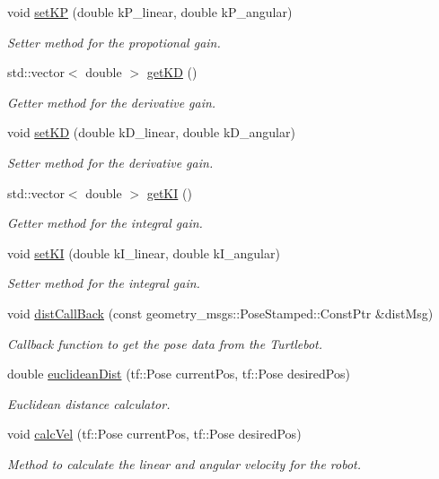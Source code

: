 \begin{DoxyCompactItemize}
void \hyperlink{classPidController_a7919dfdd721488b7062d031c295f94d9}{set\+KP} (double k\+P\+\_\+linear, double k\+P\+\_\+angular)
\begin{DoxyCompactList}\small\item\em Setter method for the propotional gain. \end{DoxyCompactList}\item 
std\+::vector$<$ double $>$ \hyperlink{classPidController_ad43a8028641d06477d7082cf29a05aa3}{get\+KD} ()
\begin{DoxyCompactList}\small\item\em Getter method for the derivative gain. \end{DoxyCompactList}\item 
void \hyperlink{classPidController_af2089d082303543f70b08a2a11e0c928}{set\+KD} (double k\+D\+\_\+linear, double k\+D\+\_\+angular)
\begin{DoxyCompactList}\small\item\em Setter method for the derivative gain. \end{DoxyCompactList}\item 
std\+::vector$<$ double $>$ \hyperlink{classPidController_a0d33ac884b7de8b3218f6c80239d7d7c}{get\+KI} ()
\begin{DoxyCompactList}\small\item\em Getter method for the integral gain. \end{DoxyCompactList}\item 
void \hyperlink{classPidController_ad77c4309d1bac07395a906be6985d801}{set\+KI} (double k\+I\+\_\+linear, double k\+I\+\_\+angular)
\begin{DoxyCompactList}\small\item\em Setter method for the integral gain. \end{DoxyCompactList}\item 
void \hyperlink{classPidController_a3be39f89aeb0c489ac55a93b2cf3afd9}{dist\+Call\+Back} (const geometry\+\_\+msgs\+::\+Pose\+Stamped\+::\+Const\+Ptr \&dist\+Msg)
\begin{DoxyCompactList}\small\item\em Callback function to get the pose data from the Turtlebot. \end{DoxyCompactList}\item 
double \hyperlink{classPidController_a6ebafee7b98417079b7a07433566ead1}{euclidean\+Dist} (tf\+::\+Pose current\+Pos, tf\+::\+Pose desired\+Pos)
\begin{DoxyCompactList}\small\item\em Euclidean distance calculator. \end{DoxyCompactList}\item 
void \hyperlink{classPidController_a08d0ca81d46313df3a5b3f0a8be29d87}{calc\+Vel} (tf\+::\+Pose current\+Pos, tf\+::\+Pose desired\+Pos)
\begin{DoxyCompactList}\small\item\em Method to calculate the linear and angular velocity for the robot. \end{DoxyCompactList}\end{DoxyCompactItemize}
